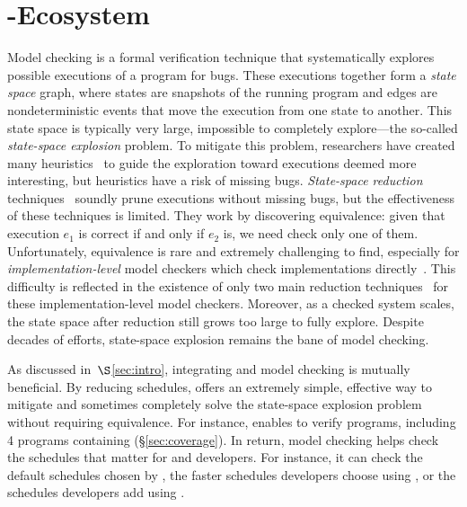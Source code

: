 \section{\parrot-\dbug Ecosystem} \label{sec:mc}



Model checking is a formal verification technique that systematically
explores possible executions of a program for bugs.  These executions
together form a \emph{state space} graph, where states are snapshots of the
running program and edges are nondeterministic events that move the
execution from one state to another.  This state space is typically very
large, impossible to completely explore---the so-called \emph{state-space
  explosion} problem.  To mitigate this problem, researchers have created
many heuristics~\cite{yang:fisc:osdi,musuvathi:aodv,killian:macemc:nsdi07} to guide the exploration toward executions
deemed more interesting, but heuristics have a risk of missing bugs.
\emph{State-space reduction} techniques~\cite{flanagan:dynamicpo,godefroid:verisoft,demeter:sosp11} soundly prune
executions without missing bugs, but the effectiveness of these techniques
is limited.  They work by discovering equivalence: given
that execution $e_1$ is correct if and only if $e_2$ is, we need check only
one of them. Unfortunately, equivalence is rare and extremely challenging
to find, especially for \emph{implementation-level} model checkers which
check implementations directly~\cite{godefroid:verisoft,musuvathi:aodv,yang:fisc:osdi,yang:explode:osdi,killian:macemc:nsdi07,dbug:spin11}.
This difficulty is reflected in the existence of only two main reduction
techniques~\cite{flanagan:dynamicpo, demeter:sosp11} for these implementation-level model
checkers.  Moreover, as a checked system scales, the state space after
reduction still grows too large to fully explore.  Despite
decades of efforts, state-space explosion remains the bane of model
checking.

As discussed in~$\S$\ref{sec:intro}, integrating \smt and model checking is
mutually beneficial.  By reducing schedules, \smt offers an extremely
simple, effective way to mitigate and sometimes completely solve the
state-space explosion problem without requiring equivalence.  For
instance, \parrot enables \dbug to verify \nprogverifiedxxx programs,
including 4 programs containing \nondets (\S\ref{sec:coverage}).
In return, model
checking helps check the schedules that matter for \parrot and developers.
For instance, it can check the default schedules chosen by \parrot, the
faster schedules developers choose using \computes, or the schedules
developers add using \nondets.

